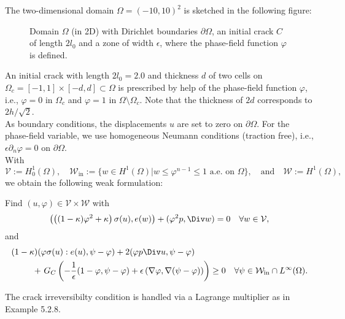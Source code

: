 The two-dimensional domain $\Omega = (-10,10)^2$ is sketched in the following figure: 
\begin{figure}[htbp!]
 \centering
{}
\caption{Domain $\Omega$ (in 2D) with Dirichlet boundaries $\partial\Omega$, an initial crack $C$ of length $2l_0$ and a zone of width $\epsilon$, where the phase-field function $\varphi$ is defined.}
 \end{figure}
 
 An initial crack with length $2l_0 = 2.0$
and thickness $d$ of two cells
on 
$\Omega_c=[-1,1] \times [-d, d] \subset \Omega$ 
is prescribed by help of the phase-field function $\varphi$, i.e.,
$\varphi = 0$ in $\Omega_c$ and $\varphi = 1$ in $\Omega\setminus\Omega_c$.
Note that the thickness of $2d$ corresponds to $2h/\sqrt{2}$.\\
As boundary conditions, the displacements $u$ are set to zero on $\partial
\Omega$.
For the phase-field variable, we use homogeneous Neumann conditions (traction
free), i.e., $\epsilon \partial_n \varphi = 0$ on $\partial \Omega$.\\

With
\[
  \mathcal{V}:=H_0^1(\Omega), \quad  \mathcal{W}_{\text{in}}:=\{w \in H^1(\Omega)| w\leq
  \varphi^{n-1} \leq 1\text{ a.e. on }\Omega\}, \quad\text{and}\quad\mathcal{ W}:=H^1(\Omega),
\]
we obtain the following weak formulation:

\begin{Problem}
Find $(u,\varphi) \in \mathcal{V} \times \mathcal{W}$ with
\begin{align*}
\left( \left((1-\kappa)\varphi^2 + \kappa\right) \sigma(u),e(w)\right)+(\varphi^2 p,\Div w)=0\quad \forall w \in \mathcal{V},
\end{align*}
and
\begin{align*}
(1- \kappa)(&\varphi \sigma(u):e(u),\psi-\varphi) + 2(\varphi p \Div u,\psi-\varphi)\\
+&\ G_C\left(-\frac{1}{\epsilon}(1-\varphi,\psi-\varphi)+\epsilon\left(\nabla \varphi,\nabla(\psi-\varphi)\right) \right)\geq 0\quad \forall \psi \in \mathcal{W}_{\text{in}} \cap L^{\infty}(\Omega).
\end{align*}
\end{Problem}
The crack irreversibilty condition is handled via a Lagrange multiplier as in Example 5.2.8.\\

